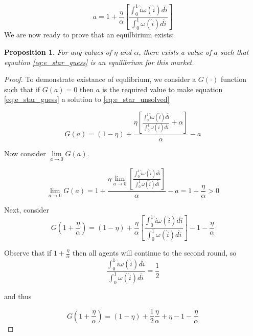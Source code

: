\documentclass[WP]{AEA}
\newtheorem{prop}{Proposition}
\begin{document}
\begin{equation} \label{eq:a_solved}
a= 1 + \frac{   \eta}{\alpha} \left[ \frac{\int_0^1 \hat{i} \omega(\hat{i}) d\hat{i}}{\int_0^1  \omega(\hat{i}) d\hat{i}}   \right] 
\end{equation}
We are now ready to prove that an equilbirium exists:
\begin{prop} \label{prop:existence}  
	For any values of $\eta$ and $\alpha$, there exists a value of $a$ such that equation \ref{eq:e_star_guess} is an equilibrium for this market.
\end{prop}
\begin{proof}
To demonstrate existance of equlibrium, we consider a $G(\cdot)$ function such that if $G(a) = 0$ then $a$ is the required value to make equation \ref{eq:e_star_guess} a solution to \ref{eq:e_star_unsolved}

\begin{equation} \label{eq:G_fxn}
G(a) = (1-\eta) + \frac{   \eta\left[ \frac{\int_0^1 \hat{i} \omega(\hat{i}) d\hat{i}}{\int_0^1  \omega(\hat{i}) d\hat{i}} + \alpha  \right] }{\alpha} - a
\end{equation}

Now consider $\lim\limits_{a \to 0}G(a)$.

\begin{equation}
\lim\limits_{a \to 0}G(a) = 1+ \frac{   \eta \lim\limits_{a \to 0}\left[ \frac{\int_0^1 \hat{i} \omega(\hat{i}) d\hat{i}}{\int_0^1  \omega(\hat{i}) d\hat{i}}   \right] }{\alpha} - a = 1+ \frac{\eta}{\alpha} > 0
\end{equation} 




Next, consider 
\begin{equation*}
G(1+\frac{\eta }{\alpha}) = (1-\eta) + \frac{   \eta }{\alpha}\left[ \frac{\int_0^1 \hat{i} \omega(\hat{i}) d\hat{i}}{\int_0^1  \omega(\hat{i}) d\hat{i}}   \right] -1 -\frac{\eta }{\alpha}
\end{equation*}

Observe that if $1+\frac{\eta }{\alpha}$ then all agents will continue to the second round, so
$$\frac{\int_0^1 \hat{i} \omega(\hat{i}) d\hat{i}}{\int_0^1  \omega(\hat{i}) d\hat{i}}  = \frac{1}{2} $$

and thus 

\begin{equation*}
G(1+\frac{\eta }{\alpha}) = (1-\eta) + \frac{1}{2} \frac{   \eta }{\alpha } + \eta -1 -\frac{\eta }{\alpha} 
\end{equation*}


\end{proof}
\end{document}
